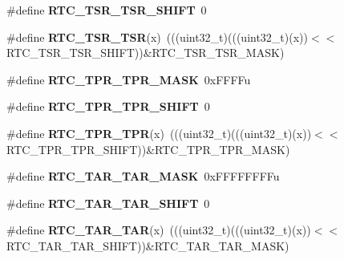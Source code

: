 \begin{DoxyCompactItemize}
\item 
\#define {\bfseries R\+T\+C\+\_\+\+T\+S\+R\+\_\+\+T\+S\+R\+\_\+\+S\+H\+I\+FT}~0\hypertarget{group__RTC__Register__Masks_gad0476d1e39a866b5b5ba4728b55e258a}{}\label{group__RTC__Register__Masks_gad0476d1e39a866b5b5ba4728b55e258a}

\item 
\#define {\bfseries R\+T\+C\+\_\+\+T\+S\+R\+\_\+\+T\+SR}(x)~(((uint32\+\_\+t)(((uint32\+\_\+t)(x))$<$$<$R\+T\+C\+\_\+\+T\+S\+R\+\_\+\+T\+S\+R\+\_\+\+S\+H\+I\+FT))\&R\+T\+C\+\_\+\+T\+S\+R\+\_\+\+T\+S\+R\+\_\+\+M\+A\+SK)\hypertarget{group__RTC__Register__Masks_ga0265b25e77883b6b0cb056ab697b5bc6}{}\label{group__RTC__Register__Masks_ga0265b25e77883b6b0cb056ab697b5bc6}

\item 
\#define {\bfseries R\+T\+C\+\_\+\+T\+P\+R\+\_\+\+T\+P\+R\+\_\+\+M\+A\+SK}~0x\+F\+F\+F\+Fu\hypertarget{group__RTC__Register__Masks_ga2682f687fa561be2f002fc574d48cc79}{}\label{group__RTC__Register__Masks_ga2682f687fa561be2f002fc574d48cc79}

\item 
\#define {\bfseries R\+T\+C\+\_\+\+T\+P\+R\+\_\+\+T\+P\+R\+\_\+\+S\+H\+I\+FT}~0\hypertarget{group__RTC__Register__Masks_ga624a290f73478b3ca2687ac49cc78fb2}{}\label{group__RTC__Register__Masks_ga624a290f73478b3ca2687ac49cc78fb2}

\item 
\#define {\bfseries R\+T\+C\+\_\+\+T\+P\+R\+\_\+\+T\+PR}(x)~(((uint32\+\_\+t)(((uint32\+\_\+t)(x))$<$$<$R\+T\+C\+\_\+\+T\+P\+R\+\_\+\+T\+P\+R\+\_\+\+S\+H\+I\+FT))\&R\+T\+C\+\_\+\+T\+P\+R\+\_\+\+T\+P\+R\+\_\+\+M\+A\+SK)\hypertarget{group__RTC__Register__Masks_gac2c160abce9b85ad4d9386f0dd8c31ea}{}\label{group__RTC__Register__Masks_gac2c160abce9b85ad4d9386f0dd8c31ea}

\item 
\#define {\bfseries R\+T\+C\+\_\+\+T\+A\+R\+\_\+\+T\+A\+R\+\_\+\+M\+A\+SK}~0x\+F\+F\+F\+F\+F\+F\+F\+Fu\hypertarget{group__RTC__Register__Masks_ga649a76416ad00079054bd866565dada2}{}\label{group__RTC__Register__Masks_ga649a76416ad00079054bd866565dada2}

\item 
\#define {\bfseries R\+T\+C\+\_\+\+T\+A\+R\+\_\+\+T\+A\+R\+\_\+\+S\+H\+I\+FT}~0\hypertarget{group__RTC__Register__Masks_ga9ec8791d91dc36f0f59a7705988f7278}{}\label{group__RTC__Register__Masks_ga9ec8791d91dc36f0f59a7705988f7278}

\item 
\#define {\bfseries R\+T\+C\+\_\+\+T\+A\+R\+\_\+\+T\+AR}(x)~(((uint32\+\_\+t)(((uint32\+\_\+t)(x))$<$$<$R\+T\+C\+\_\+\+T\+A\+R\+\_\+\+T\+A\+R\+\_\+\+S\+H\+I\+FT))\&R\+T\+C\+\_\+\+T\+A\+R\+\_\+\+T\+A\+R\+\_\+\+M\+A\+SK)\hypertarget{group__RTC__Register__Masks_ga02ce5bc2603bebe1356ce961142f6700}{}\label{group__RTC__Register__Masks_ga02ce5bc2603bebe1356ce961142f6700}


\end{DoxyCompactItemize}
